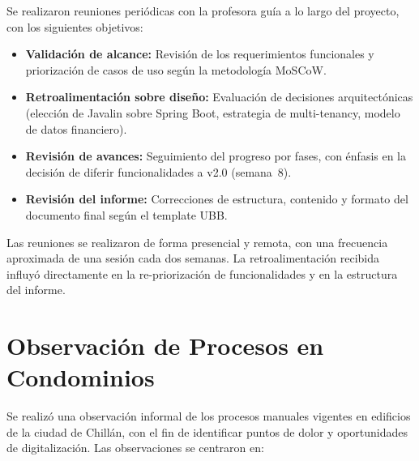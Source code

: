 Se realizaron reuniones periódicas con la profesora guía a lo largo del proyecto, con los siguientes objetivos:

\begin{itemize}
    \item \textbf{Validación de alcance:} Revisión de los requerimientos funcionales y priorización de casos de uso según la metodología MoSCoW.
    \item \textbf{Retroalimentación sobre diseño:} Evaluación de decisiones arquitectónicas (elección de Javalin sobre Spring Boot, estrategia de multi-tenancy, modelo de datos financiero).
    \item \textbf{Revisión de avances:} Seguimiento del progreso por fases, con énfasis en la decisión de diferir funcionalidades a v2.0 (semana~8).
    \item \textbf{Revisión del informe:} Correcciones de estructura, contenido y formato del documento final según el template UBB.
\end{itemize}

Las reuniones se realizaron de forma presencial y remota, con una frecuencia aproximada de una sesión cada dos semanas. La retroalimentación recibida influyó directamente en la re-priorización de funcionalidades y en la estructura del informe.

\section{Observación de Procesos en Condominios}

Se realizó una observación informal de los procesos manuales vigentes en edificios de la ciudad de Chillán, con el fin de identificar puntos de dolor y oportunidades de digitalización. Las observaciones se centraron en:


